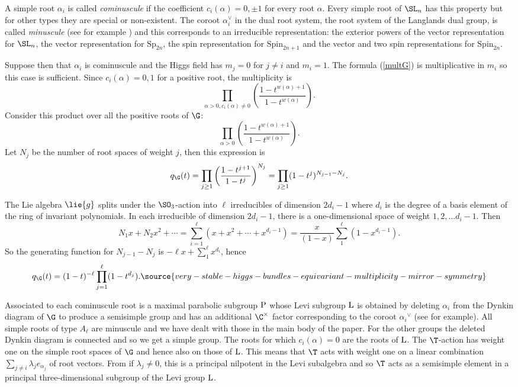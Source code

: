 A simple root $\alpha_i$ is called {\it cominuscule} if the coefficient $c_i(\alpha)=0,\pm1$ for every root $\alpha$.  Every simple root of $\SL_n$ has this property but for other types  they are special or non-existent. The coroot $\alpha_i^{\vee}$ in the dual root system, the root system of the Langlands dual group, is called {\it minuscule} (see for example \cite{Buch}) and this corresponds to an irreducible representation: the exterior powers of the vector representation for $\SL_n$, the vector representation for $\mathrm{Sp}_{2n}$, the spin representation for $\mathrm{Spin}_{2n+1}$ and the vector and two spin representations for $\mathrm{Spin}_{2n}$.


Suppose then that $\alpha_i$ is cominuscule and the Higgs field has $m_j=0$ for $j\ne i$ and $m_i=1$. The formula (\ref{multG}) is multiplicative in $m_i$ so this case is sufficient. Since $c_i(\alpha)=0,1$ for a positive root, the multiplicity is
$$\prod_{\alpha>0, c_i(\alpha)\ne 0}\left(\frac{1-t^{w(\alpha)+1}}{1-t^{w(\alpha)}}\right). $$
Consider this product over all the positive roots of $\G$:
$$\prod_{\alpha>0}\left(\frac{1-t^{w(\alpha)+1}}{1-t^{w(\alpha)}}\right). $$
Let $N_j$ be the number of root spaces of weight $j$, then this expression is
$$q_\G(t)=\prod_{j\ge 1}\left(\frac{1-t^{j+1}}{1-t^{j}}\right)^{N_j}= \prod_{j\ge 1}(1-t^{j})^{N_{j-1}-N_j}.$$

The Lie algebra $\lie{g}$ splits under the $\SO_3$-action into $\ell$  irreducibles of dimension $2d_i-1$ where $d_i$ is the degree of a basis element of the ring of invariant polynomials. In each irreducible of dimension $2d_i-1$, there is a one-dimensional space of weight $1,2,\dots d_i-1$. Then $$N_1x+N_2x^2+\cdots =\sum_{i=1}^{\ell}(x+x^2+\cdots + x^{d_i-1})=\frac{x}{(1-x)}\sum_1^{\ell}(1-x^{d_i-1}).$$
So the generating function for $N_{j-1}-N_j$ is
$-\ell x+\sum_1^{\ell}x^{d_i}$, hence
\begin{equation}
q_\G(t)=(1-t)^{-{\ell}}  \prod_{j=1}^{\ell}(1-t^{d_j}).
\label{qG}
\source{very-stable-higgs-bundles-equivariant-multiplicity-mirror-symmetry}
\end{equation}

Associated to each cominuscule root is a maximal parabolic subgroup $\rm P$ whose Levi subgroup $\rm L$  is obtained by deleting $\alpha_i$ from the Dynkin diagram of $\G$ to produce a semisimple group and  has an additional $\C^\times$ factor corresponding to the coroot ${\alpha_i}^{\vee}$ (see \cite{Buch} for example). All simple roots of type $A_{\ell}$ are minuscule and we have dealt with those in the main body of the paper. For  the other groups the deleted Dynkin diagram is connected and so we get a simple group. The roots for which $c_i(\alpha)=0$ are the roots of $\rm L$.  The $\T$-action has weight one on  the simple root spaces  of $\G$ and hence also  on those of $\rm L$. This means that $\T$ acts with weight one on a linear combination $\sum_{j\ne i} \lambda_je_{\alpha_j}$ of root vectors. From \cite{Kos} if $\lambda_j\ne 0$, this is a principal nilpotent in the Levi subalgebra and so $\T$ acts as a semisimple element in a principal three-dimensional subgroup of the Levi group $\rm L$.

